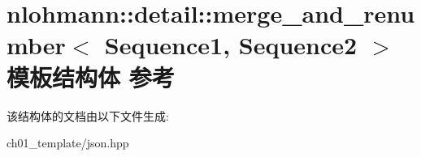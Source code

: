 \hypertarget{structnlohmann_1_1detail_1_1merge__and__renumber}{}\section{nlohmann\+::detail\+::merge\+\_\+and\+\_\+renumber$<$ Sequence1, Sequence2 $>$ 模板结构体 参考}
\label{structnlohmann_1_1detail_1_1merge__and__renumber}


该结构体的文档由以下文件生成\+:\begin{DoxyCompactItemize}
\item 
ch01\+\_\+template/json.\+hpp\end{DoxyCompactItemize}
